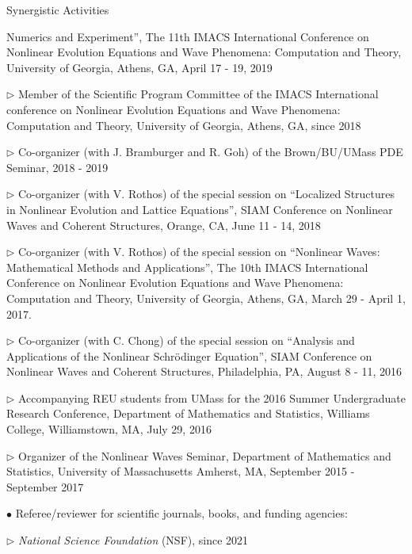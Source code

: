 \documentclass[10pt]{article} %
\newenvironment{outerlist}[1][\enskip\textbullet]%
        {\begin{itemize}[#1]}{\end{itemize}%
         \vspace{-.6\baselineskip}}
\newenvironment{innerlist}[1][\enskip\textbullet]%
        {\begin{compactitem}[#1]}{\end{compactitem}}
\begin{document}
\begin{section}{Synergistic Activities}
\begin{outerlist}
\begin{innerlist}
                        Numerics and Experiment'', The 11th IMACS International Conference on Nonlinear Evolution Equations and Wave Phenomena: 
                        Computation and Theory, University of Georgia, Athens, GA, April 17 - 19, 2019
\item[$\triangleright$] Member of the Scientific Program Committee of the IMACS International conference on Nonlinear Evolution Equations 
                        and Wave Phenomena: Computation and Theory, University of Georgia, Athens, GA, since 2018 
\item[$\triangleright$] Co-organizer (with J. Bramburger and R. Goh) of the Brown/BU/UMass PDE Seminar, 2018 - 2019
\item[$\triangleright$] Co-organizer (with V. Rothos) of the special session on ``Localized Structures in Nonlinear Evolution
                        and Lattice Equations'', SIAM Conference on Nonlinear Waves and Coherent Structures, Orange, CA, June 11 - 14, 2018
\item[$\triangleright$] Co-organizer (with V. Rothos) of the special session on ``Nonlinear Waves: Mathematical Methods and Applications'',
                        The 10th IMACS International Conference on Nonlinear Evolution Equations and Wave Phenomena: Computation and Theory, %
                        University of Georgia, Athens, GA, March 29 - April 1, 2017. 
\item[$\triangleright$] Co-organizer (with C. Chong) of the special session on ``Analysis and Applications of the Nonlinear Schr\"odinger Equation'', 
                        SIAM Conference on Nonlinear Waves and Coherent Structures, Philadelphia, PA, August 8 - 11, 2016
\item[$\triangleright$] Accompanying REU students from UMass for the 2016 Summer Undergraduate Research Conference, Department of Mathematics 
                        and Statistics, Williams College, Williamstown, MA, July 29, 2016      
\item[$\triangleright$] Organizer of the Nonlinear Waves Seminar, Department of Mathematics and Statistics, University of Massachusetts Amherst, 
                        MA, September 2015 - September 2017 
\end{innerlist} 
\item[$\bullet$] Referee/reviewer for scientific journals, books, and funding agencies:
\begin{innerlist}
\item[$\triangleright$] \textit{National Science Foundation} (NSF), since 2021

\end{innerlist}
\end{outerlist}
\end{section}
\end{document}
